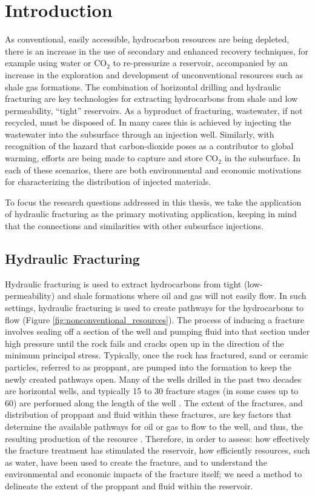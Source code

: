 
\chapter{Introduction}
\label{ch:introduction}
As conventional, easily accessible, hydrocarbon resources are being depleted, there is an increase in the use of secondary and enhanced recovery techniques, for example using water or CO$_2$ to re-pressurize a reservoir, accompanied by an increase in the exploration and development of unconventional resources such as shale gas formations. The combination of horizontal drilling and hydraulic fracturing are key technologies for extracting hydrocarbons from shale and low permeability, ``tight'' reservoirs. As a byproduct of fracturing, wastewater, if not recycled, must be disposed of. In many cases this is achieved by injecting the wastewater into the subsurface through an injection well. Similarly, with recognition of the hazard that carbon-dioxide poses as a contributor to global warming, efforts are being made to capture and store CO$_2$ in the subsurface. In each of these scenarios, there are both environmental and economic motivations for characterizing the distribution of injected materials.

To focus the research questions addressed in this thesis, we take the application of hydraulic fracturing as the primary motivating application, keeping in mind that the connections and similarities with other subsurface injections.
\section{Hydraulic Fracturing}

Hydraulic fracturing is used to extract hydrocarbons from tight (low-permeability) and shale formations where oil and gas will not easily flow. In such settings, hydraulic fracturing is used to create pathways for the hydrocarbons to flow (Figure \ref{fig:nonconventional_resources}). The process of inducing a fracture involves sealing off a section of the well and pumping fluid into that section under high pressure until the rock fails and cracks open up in the direction of the minimum principal stress. Typically, once the rock has fractured, sand or ceramic particles, referred to as proppant, are pumped into the formation to keep the newly created pathways open. Many of the wells drilled in the past two decades are horizontal wells, and typically 15 to 30 fracture stages (in some cases up to 60) are performed along the length of the well \citep{Maxwell2014}.
The extent of the fractures, and distribution of proppant and fluid within these fractures, are key factors that determine the available pathways for oil or gas to flow to the well, and thus, the resulting production of the resource \citep{Brannon2008, Cipolla2009}. Therefore, in order to assess: how effectively the fracture treatment has stimulated the reservoir, how efficiently resources, such as water, have been used to create the fracture, and to understand the environmental and economic impacts of the fracture itself; we need a method to delineate the extent of the proppant and fluid within the reservoir.


